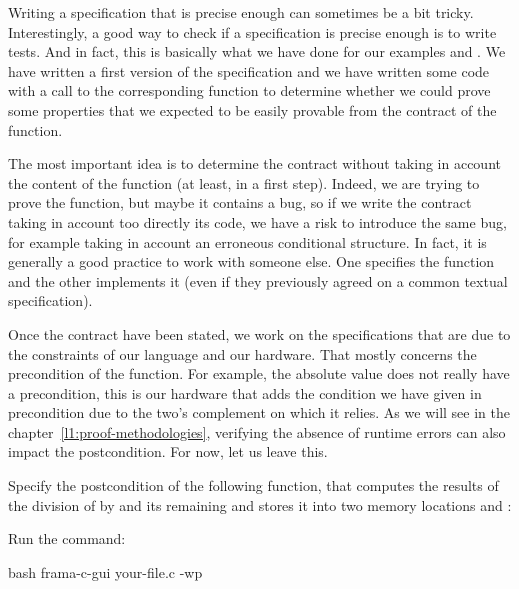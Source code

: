 

Writing a specification that is precise enough can sometimes be a bit tricky.
Interestingly, a good way to check if a specification is precise enough is to
write tests. And in fact, this is basically what we have done for our examples
 and . We have written a first version of the
specification and we have written some code with a call to the corresponding
function to determine whether we could prove some properties that we expected to
be easily provable from the contract of the function.



The most important
idea is to determine the contract without taking in account the content of the
function (at least, in a first step). Indeed, we are trying to prove the
function, but maybe it contains a bug, so if we write the contract taking in
account too directly its code, we have a risk to introduce the same bug, for
example taking in account an erroneous conditional structure. In fact, it is
generally a good practice to work with someone else. One specifies the function
and the other implements it (even if they previously agreed on a common textual
specification).



Once the contract have been stated, we work on the specifications that are due
to the constraints of our language and our hardware. That mostly concerns the
precondition of the function. For example, the absolute value does not really
have a precondition, this is our hardware that adds the condition we have given
in precondition due to the two's complement on which it relies. As we will see
in the chapter~\ref{l1:proof-methodologies}, verifying the absence of runtime
errors can also impact the postcondition. For now, let us leave this.








Specify the postcondition of the following function, that computes the
results of the division of  by  and its
remaining and stores it into two memory locations  and
:



Run the command:

\begin{CodeBlock}{bash}
frama-c-gui your-file.c -wp
\end{CodeBlock}


